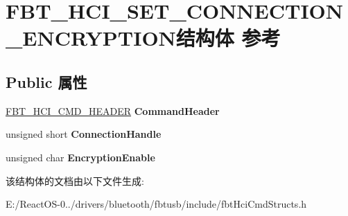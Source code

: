 \hypertarget{struct_f_b_t___h_c_i___s_e_t___c_o_n_n_e_c_t_i_o_n___e_n_c_r_y_p_t_i_o_n}{}\section{F\+B\+T\+\_\+\+H\+C\+I\+\_\+\+S\+E\+T\+\_\+\+C\+O\+N\+N\+E\+C\+T\+I\+O\+N\+\_\+\+E\+N\+C\+R\+Y\+P\+T\+I\+O\+N结构体 参考}
\label{struct_f_b_t___h_c_i___s_e_t___c_o_n_n_e_c_t_i_o_n___e_n_c_r_y_p_t_i_o_n}
\subsection*{Public 属性}
\begin{DoxyCompactItemize}
\item 
\mbox{\label{struct_f_b_t___h_c_i___s_e_t___c_o_n_n_e_c_t_i_o_n___e_n_c_r_y_p_t_i_o_n_a399649d9967a1efe30ba1c66de0a3d34}} 
\hyperlink{struct_f_b_t___h_c_i___c_m_d___h_e_a_d_e_r}{F\+B\+T\+\_\+\+H\+C\+I\+\_\+\+C\+M\+D\+\_\+\+H\+E\+A\+D\+ER} {\bfseries Command\+Header}
\item 
\mbox{\label{struct_f_b_t___h_c_i___s_e_t___c_o_n_n_e_c_t_i_o_n___e_n_c_r_y_p_t_i_o_n_a41c913138b7c2737030e4eb65ff45e42}} 
unsigned short {\bfseries Connection\+Handle}
\item 
\mbox{\label{struct_f_b_t___h_c_i___s_e_t___c_o_n_n_e_c_t_i_o_n___e_n_c_r_y_p_t_i_o_n_a465a064cbbbc596c714ada3fbde82059}} 
unsigned char {\bfseries Encryption\+Enable}
\end{DoxyCompactItemize}


该结构体的文档由以下文件生成\+:\begin{DoxyCompactItemize}
\item 
E\+:/\+React\+O\+S-\/0../drivers/bluetooth/fbtusb/include/fbt\+Hci\+Cmd\+Structs.\+h\end{DoxyCompactItemize}
